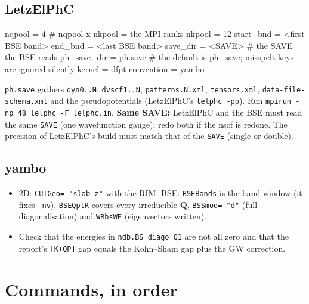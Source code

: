 \documentclass[10pt,a4paper]{article}
\newcommand{\bQ}{\mathbf{Q}}
\begin{document}
\subsection{LetzElPhC}
\begin{cmd}
nqpool      = 4               # nqpool x nkpool = the MPI ranks
nkpool      = 12
start_bnd   = <first BSE band>
end_bnd     = <last BSE band>
save_dir    = <SAVE>          # the SAVE the BSE reads
ph_save_dir = ph.save         # the default is ph_save; misspelt keys are ignored silently
kernel      = dfpt
convention  = yambo
\end{cmd}
\texttt{ph.save} gathers \texttt{dyn0..N}, \texttt{dvscf1..N}, \texttt{patterns.N.xml}, \texttt{tensors.xml},
\texttt{data-file-schema.xml} and the pseudopotentials (LetzElPhC's \texttt{lelphc -pp}). Run \texttt{mpirun -np 48 lelphc -F lelphc.in}.
\textbf{Same SAVE:} LetzElPhC and the BSE must read the same \texttt{SAVE} (one wavefunction gauge); redo both if the nscf is redone.
The precision of LetzElPhC's build must match that of the \texttt{SAVE} (single or double).
\subsection{yambo}
\begin{itemize}[nosep,leftmargin=1.4em]
\item 2D: \texttt{CUTGeo= "slab z"} with the RIM. BSE: \texttt{BSEBands} is the band window (it fixes \texttt{--nv}),
\texttt{BSEQptR} covers every irreducible $\bQ$, \texttt{BSSmod= "d"} (full diagonalisation) and \texttt{WRbsWF} (eigenvectors written).
\item Check that the energies in \texttt{ndb.BS\_diago\_Q1} are not all zero and that the report's \texttt{[K+QP]} gap equals the
Kohn--Sham gap plus the GW correction.
\end{itemize}

\section{Commands, in order}
\end{document}
